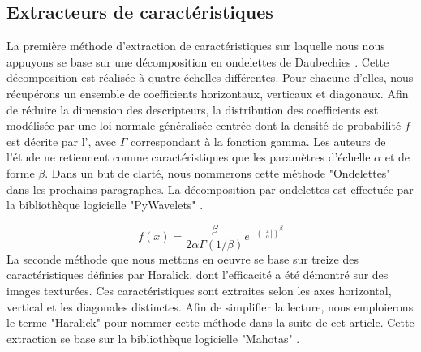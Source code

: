 \documentclass{gretsi}
\begin{document}
\begin{sloppypar}
\subsection{Extracteurs de caractéristiques}
La première méthode d'extraction de caractéristiques sur laquelle nous nous appuyons se base sur une décomposition en ondelettes de Daubechies \cite{Halimi2017a}. Cette décomposition est réalisée à quatre échelles différentes. Pour chacune d'elles, nous récupérons un ensemble de coefficients horizontaux, verticaux et diagonaux. Afin de réduire la dimension des descripteurs, la distribution des coefficients est modélisée par une loi normale généralisée centrée dont la densité de probabilité $f$ est décrite par l', avec $\Gamma$ correspondant à la fonction gamma. Les auteurs de l'étude ne retiennent comme caractéristiques que les paramètres d'échelle $\alpha$ et de forme $\beta$. Dans un but de clarté, nous nommerons cette méthode "Ondelettes" dans les prochains paragraphes. La décomposition par ondelettes est effectuée par la bibliothèque logicielle "PyWavelets" \cite{lee2006pywavelets}.\par
\begin{equation}
    f(x)= \frac{\beta}{2\alpha\Gamma(1/\beta)} e^{-\left(|\frac{x}{\alpha}|\right)^\beta}
    \label{ggd}
\end{equation}
La seconde méthode que nous mettons en oeuvre se base sur treize des caractéristiques définies par Haralick, dont l'efficacité a été démontré sur des images texturées. Ces caractéristiques sont extraites selon les axes horizontal, vertical et les diagonales distinctes. Afin de simplifier la lecture, nous emploierons le terme "Haralick" pour nommer cette méthode dans la suite de cet article. Cette extraction se base sur la bibliothèque logicielle "Mahotas" \cite{coelho2012mahotas}.\par

\end{sloppypar}
\end{document}
